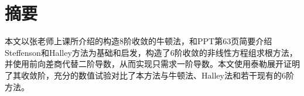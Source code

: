 
\section*{摘要}

本文以张老师上课所介绍的构造8阶收敛的牛顿法，和PPT第63页简要介绍Steffenson和Halley方法为基础和启发，构造了6阶收敛的非线性方程组求根方法，并使用前向差商代替二阶导数，从而实现只需求一阶导数。本文使用泰勒展开证明了其收敛阶，充分的数值试验对比了本方法与牛顿法、Halley法和若干现有的6阶方法。



